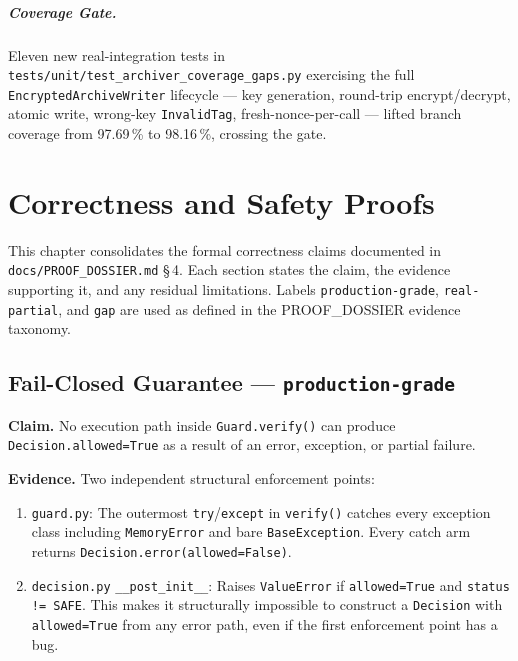 \documentclass[12pt,a4paper,oneside]{report}
\newcommand{\fname}[1]{\texttt{#1}}          %
\newcommand{\code}[1]{\texttt{#1}}           %
\newcommand{\cfrsec}[1]{\S\,#1}             %
\begin{document}
\paragraph{Coverage Gate.}
Eleven new real-integration tests in
\fname{tests/unit/test\_archiver\_coverage\_gaps.py} exercising the full
\code{EncryptedArchiveWriter} lifecycle --- key generation, round-trip
encrypt/decrypt, atomic write, wrong-key \code{InvalidTag}, fresh-nonce-per-call
--- lifted branch coverage from 97.69\,\% to 98.16\,\%, crossing the gate.

\chapter{Correctness and Safety Proofs}

This chapter consolidates the formal correctness claims documented in
\fname{docs/PROOF\_DOSSIER.md} \cfrsec{4}.  Each section states the claim,
the evidence supporting it, and any residual limitations.  Labels
\code{production-grade}, \code{real-partial}, and \code{gap} are used as
defined in the PROOF\_DOSSIER evidence taxonomy.

\section{Fail-Closed Guarantee --- \code{production-grade}}

\textbf{Claim.}  No execution path inside \code{Guard.verify()} can produce
\code{Decision.allowed=True} as a result of an error, exception, or partial
failure.

\textbf{Evidence.}  Two independent structural enforcement points:

\begin{enumerate}
  \item \fname{guard.py}: The outermost \code{try}/\code{except} in
        \code{verify()} catches every exception class including
        \code{MemoryError} and bare \code{BaseException}.  Every catch
        arm returns \code{Decision.error(allowed=False)}.

  \item \fname{decision.py} \code{\_\_post\_init\_\_}: Raises \code{ValueError}
        if \code{allowed=True} and \code{status != SAFE}.  This makes it
        structurally impossible to construct a \code{Decision} with
        \code{allowed=True} from any error path, even if the first
        enforcement point has a bug.
\end{enumerate}
\end{document}
